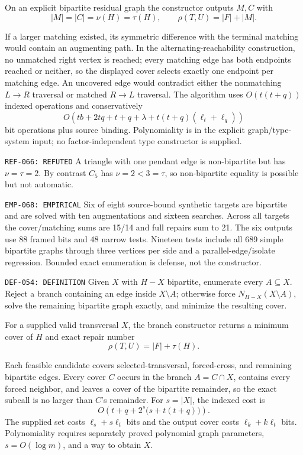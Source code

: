 \documentclass[11pt]{article}
\begin{document}
{}
On an explicit bipartite residual graph the constructor outputs \(M,C\)
with
\[
 |M|=|C|=\nu(H)=\tau(H),\qquad
 \rho(T,U)=|F|+|M|.
\]
\begin{claimproof}
If a larger matching existed, its symmetric difference with the terminal
matching would contain an augmenting path.  In the alternating-reachability
construction, no unmatched right vertex is reached; every matching edge has
both endpoints reached or neither, so the displayed cover selects exactly
one endpoint per matching edge.  An uncovered edge would contradict either
the nonmatching \(L\to R\) traversal or matched \(R\to L\) traversal.
The algorithm uses \(O(t(t+q))\) indexed operations and conservatively
\[
 O(tb+2tq+t+q+\lambda+t(t+q)(\ell_t+\ell_q))
\]
bit operations plus source binding.  Polynomiality is in the explicit
graph/type-system input; no factor-independent type constructor is supplied.
\end{claimproof}

{\texttt{REF-066: REFUTED}}
A triangle with one pendant edge is non-bipartite but has
\(\nu=\tau=2\).  By contrast \(C_5\) has \(\nu=2<3=\tau\), so
non-bipartite equality is possible but not automatic.

{\texttt{EMP-068: EMPIRICAL}}
Six of eight source-bound synthetic targets are bipartite and are solved
with ten augmentations and sixteen searches.  Across all targets the
cover/matching sums are 15/14 and full repairs sum to 21.  The six outputs
use 88 framed bits and 48 narrow tests.  Nineteen tests include all 689 simple
bipartite graphs through three vertices per side and a parallel-edge/isolate
regression.  Bounded exact enumeration is defense, not the constructor.

{\texttt{DEF-054: DEFINITION}}
Given \(X\) with \(H-X\) bipartite, enumerate every \(A\subseteq X\).
Reject a branch containing an edge inside \(X\setminus A\); otherwise force
\(N_{H-X}(X\setminus A)\), solve the remaining bipartite graph exactly, and
minimize the resulting cover.

{}
For a supplied valid transversal \(X\), the branch constructor returns a
minimum cover of \(H\) and exact repair number
\[
 \rho(T,U)=|F|+\tau(H).
\]
\begin{claimproof}
Each feasible candidate covers selected-transversal, forced-cross, and
remaining bipartite edges.  Every cover \(C\) occurs in the branch
\(A=C\cap X\), contains every forced neighbor, and leaves a cover of the
bipartite remainder, so the exact subcall is no larger than \(C\)'s
remainder.  For \(s=|X|\), the indexed cost is
\[
 O\!\left(t+q+2^s\bigl(s+t(t+q)\bigr)\right).
\]
The supplied set costs \(\ell_s+s\ell_t\) bits and the output cover costs
\(\ell_k+k\ell_t\) bits.  Polynomiality requires separately proved
polynomial graph parameters, \(s=O(\log m)\), and a way to obtain \(X\).
\end{claimproof}
\end{document}
